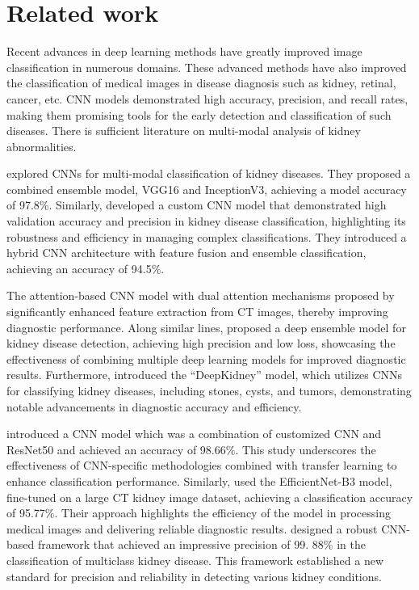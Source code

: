 \section{Related work}
Recent advances in deep learning methods have greatly improved image classification in numerous domains. These advanced methods have also improved the classification of medical images in disease diagnosis such as kidney, retinal, cancer, etc.  CNN models demonstrated high accuracy, precision, and recall rates, making them promising tools for the early detection and classification of such diseases. There is sufficient literature on multi-modal analysis of kidney abnormalities.

\cite{rajora2024advancing} explored CNNs for multi-modal classification of kidney diseases. They proposed a combined ensemble model, VGG16 and InceptionV3, achieving a model accuracy of 97.8\%. Similarly, \cite{ali2023automated} developed a custom CNN model that demonstrated high validation accuracy and precision in kidney disease classification, highlighting its robustness and efficiency in managing complex classifications. They introduced a hybrid CNN architecture with feature fusion and ensemble classification, achieving an accuracy of 94.5\%.

The attention-based CNN model with dual attention mechanisms proposed by \cite{chauhan2024attention} significantly enhanced feature extraction from CT images, thereby improving diagnostic performance. Along similar lines, \cite{sri2023deep} proposed a deep ensemble model for kidney disease detection, achieving high precision and low loss, showcasing the effectiveness of combining multiple deep learning models for improved diagnostic results. Furthermore, \cite{bindumadavi2023deepkidney} introduced the ``DeepKidney'' model, which utilizes CNNs for classifying kidney diseases, including stones, cysts, and tumors, demonstrating notable advancements in diagnostic accuracy and efficiency.

\cite{sakib2023kidney} introduced a CNN model which was a combination of customized CNN and ResNet50 and achieved an accuracy of 98.66\%. This study underscores the effectiveness of CNN-specific methodologies combined with transfer learning to enhance classification performance. Similarly, \cite{singh2023precision} used the EfficientNet-B3 model, fine-tuned on a large CT kidney image dataset, achieving a classification accuracy of 95.77\%. Their approach highlights the efficiency of the model in processing medical images and delivering reliable diagnostic results. \cite{sharma2024revolutionizing} designed a robust CNN-based framework that achieved an impressive precision of 99. 88\% in the classification of multiclass kidney disease. This framework established a new standard for precision and reliability in detecting various kidney conditions.

